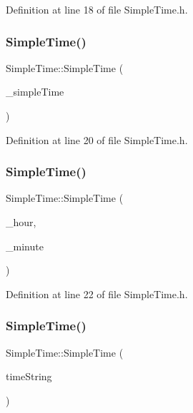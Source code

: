 Definition at line 18 of file Simple\+Time.\+h.

\mbox{\label{class_simple_time_abf929f0ba662f85ab42a9d2eb6a98a4d}} 
\subsubsection{\texorpdfstring{SimpleTime()}{SimpleTime()}\hspace{0.1cm}{\footnotesize\ttfamily [2/4]}}
{\footnotesize\ttfamily Simple\+Time\+::\+Simple\+Time (\begin{DoxyParamCaption}\item[{\mbox{\hyperlink{class_simple_time}{Simple\+Time}} const \&}]{\+\_\+simple\+Time }\end{DoxyParamCaption})\hspace{0.3cm}{\ttfamily [inline]}}



Definition at line 20 of file Simple\+Time.\+h.

\mbox{\label{class_simple_time_ac9bd49ce2f132b593d3d0d47c9efdb08}} 
\subsubsection{\texorpdfstring{SimpleTime()}{SimpleTime()}\hspace{0.1cm}{\footnotesize\ttfamily [3/4]}}
{\footnotesize\ttfamily Simple\+Time\+::\+Simple\+Time (\begin{DoxyParamCaption}\item[{uint16\+\_\+t}]{\+\_\+hour,  }\item[{uint16\+\_\+t}]{\+\_\+minute }\end{DoxyParamCaption})\hspace{0.3cm}{\ttfamily [inline]}}



Definition at line 22 of file Simple\+Time.\+h.

\mbox{\label{class_simple_time_a95825a96f5afb95060a3b36d78ac11e9}} 
\subsubsection{\texorpdfstring{SimpleTime()}{SimpleTime()}\hspace{0.1cm}{\footnotesize\ttfamily [4/4]}}
{\footnotesize\ttfamily Simple\+Time\+::\+Simple\+Time (\begin{DoxyParamCaption}\item[{String}]{time\+String }\end{DoxyParamCaption})\hspace{0.3cm}{\ttfamily [inline]}}




